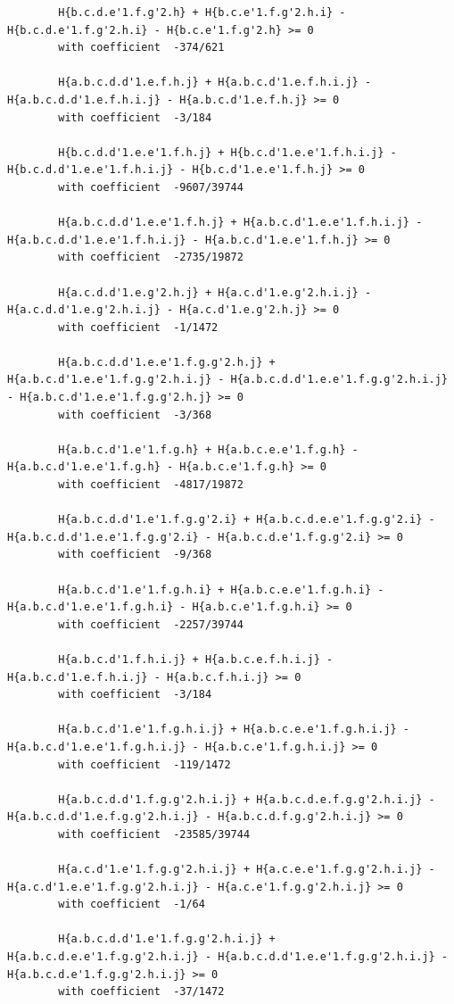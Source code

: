 \documentclass[11pt, a4paper]{kybernetika}
\begin{document}
\begin{verbatim}
		H{b.c.d.e'1.f.g'2.h} + H{b.c.e'1.f.g'2.h.i} - H{b.c.d.e'1.f.g'2.h.i} - H{b.c.e'1.f.g'2.h} >= 0
		with coefficient  -374/621
		
		H{a.b.c.d.d'1.e.f.h.j} + H{a.b.c.d'1.e.f.h.i.j} - H{a.b.c.d.d'1.e.f.h.i.j} - H{a.b.c.d'1.e.f.h.j} >= 0
		with coefficient  -3/184
		
		H{b.c.d.d'1.e.e'1.f.h.j} + H{b.c.d'1.e.e'1.f.h.i.j} - H{b.c.d.d'1.e.e'1.f.h.i.j} - H{b.c.d'1.e.e'1.f.h.j} >= 0
		with coefficient  -9607/39744
		
		H{a.b.c.d.d'1.e.e'1.f.h.j} + H{a.b.c.d'1.e.e'1.f.h.i.j} - H{a.b.c.d.d'1.e.e'1.f.h.i.j} - H{a.b.c.d'1.e.e'1.f.h.j} >= 0
		with coefficient  -2735/19872
		
		H{a.c.d.d'1.e.g'2.h.j} + H{a.c.d'1.e.g'2.h.i.j} - H{a.c.d.d'1.e.g'2.h.i.j} - H{a.c.d'1.e.g'2.h.j} >= 0
		with coefficient  -1/1472
		
		H{a.b.c.d.d'1.e.e'1.f.g.g'2.h.j} + H{a.b.c.d'1.e.e'1.f.g.g'2.h.i.j} - H{a.b.c.d.d'1.e.e'1.f.g.g'2.h.i.j} - H{a.b.c.d'1.e.e'1.f.g.g'2.h.j} >= 0
		with coefficient  -3/368
		
		H{a.b.c.d'1.e'1.f.g.h} + H{a.b.c.e.e'1.f.g.h} - H{a.b.c.d'1.e.e'1.f.g.h} - H{a.b.c.e'1.f.g.h} >= 0
		with coefficient  -4817/19872
		
		H{a.b.c.d.d'1.e'1.f.g.g'2.i} + H{a.b.c.d.e.e'1.f.g.g'2.i} - H{a.b.c.d.d'1.e.e'1.f.g.g'2.i} - H{a.b.c.d.e'1.f.g.g'2.i} >= 0
		with coefficient  -9/368
		
		H{a.b.c.d'1.e'1.f.g.h.i} + H{a.b.c.e.e'1.f.g.h.i} - H{a.b.c.d'1.e.e'1.f.g.h.i} - H{a.b.c.e'1.f.g.h.i} >= 0
		with coefficient  -2257/39744
		
		H{a.b.c.d'1.f.h.i.j} + H{a.b.c.e.f.h.i.j} - H{a.b.c.d'1.e.f.h.i.j} - H{a.b.c.f.h.i.j} >= 0
		with coefficient  -3/184
		
		H{a.b.c.d'1.e'1.f.g.h.i.j} + H{a.b.c.e.e'1.f.g.h.i.j} - H{a.b.c.d'1.e.e'1.f.g.h.i.j} - H{a.b.c.e'1.f.g.h.i.j} >= 0
		with coefficient  -119/1472
		
		H{a.b.c.d.d'1.f.g.g'2.h.i.j} + H{a.b.c.d.e.f.g.g'2.h.i.j} - H{a.b.c.d.d'1.e.f.g.g'2.h.i.j} - H{a.b.c.d.f.g.g'2.h.i.j} >= 0
		with coefficient  -23585/39744
		
		H{a.c.d'1.e'1.f.g.g'2.h.i.j} + H{a.c.e.e'1.f.g.g'2.h.i.j} - H{a.c.d'1.e.e'1.f.g.g'2.h.i.j} - H{a.c.e'1.f.g.g'2.h.i.j} >= 0
		with coefficient  -1/64
		
		H{a.b.c.d.d'1.e'1.f.g.g'2.h.i.j} + H{a.b.c.d.e.e'1.f.g.g'2.h.i.j} - H{a.b.c.d.d'1.e.e'1.f.g.g'2.h.i.j} - H{a.b.c.d.e'1.f.g.g'2.h.i.j} >= 0
		with coefficient  -37/1472
		

\end{verbatim}
\end{document}
